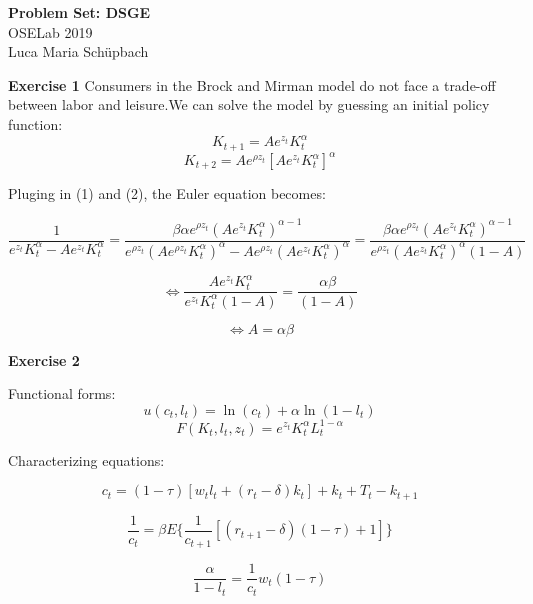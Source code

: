 \documentclass[letterpaper,12pt]{article}
\theoremstyle{definition}
\begin{document}
\begin{flushleft}
  \textbf{\large{Problem Set: DSGE}} \\
  OSELab 2019\\
  Luca Maria Schüpbach
\end{flushleft}

\vspace{5mm}

\noindent\textbf{Exercise 1}
Consumers in the Brock and Mirman model do not face a trade-off between labor and leisure.We can solve the model by guessing an initial policy function:
\begin{equation}
K_{t+1}=A e^{z_t}K_t^{\alpha}
\end{equation}
\begin{equation}
  K_{t+2}=Ae^{\rho z_t}[Ae^{z_t}K_t^{\alpha}]^{\alpha}
\end{equation}

Pluging in (1) and (2), the Euler equation becomes:

$$\frac{1}{e^{z_{t}} K_{t}^{\alpha}-Ae^{z_{t}} K_{t}^{\alpha}}=\frac{\beta \alpha e^{\rho z_{t}}(A e^{z_{t}} K_{t}^{\alpha})^{\alpha-1}}{e^{\rho z_t}(Ae^{\rho z_t}K_t^{\alpha})^{\alpha}-Ae^{\rho z_t}(Ae^{z_t}K_t^{\alpha})^{\alpha}}=\frac{\beta \alpha e^{\rho z_{t}}(A e^{z_{t}} K_{t}^{\alpha})^{\alpha-1}}{e^{\rho z_{t}}(A e^{z_{t}} K_{t}^{\alpha})^{\alpha}(1-A)} $$

$$\iff \frac{A e^{z_t} K_t^{\alpha}}{e^{z_t}K_t^{\alpha}(1-A)}=\frac{\alpha \beta}{(1-A)}$$

$$\iff A= \alpha \beta $$

\vspace{3mm}

\noindent\textbf{Exercise 2}

Functional forms:
$$u(c_{t}, l_{t})=\ln (c_{t})+\alpha \ln (1-l_{t})$$
$$F(K_{t}, l_{t}, z_{t})=e^{z_{t}} K_{t}^{\alpha} L_{t}^{1-\alpha}$$

Characterizing equations:

\begin{equation}
  \label{metric}
  c_{t}=(1-\tau)[w_{t} l_{t}+(r_{t}-\delta)k_{t}]+k_{t}+T_{t}-k_{t+1}
\end{equation}

\begin{equation}
  \label{metric}
  \frac{1}{c_t}=\beta E\{ \frac{1}{c_{t+1}}[(r_{t+1}-\delta)(1-\tau)+1]\}
\end{equation}

\begin{equation}
  \frac{\alpha}{1-l_t}=\frac{1}{c_t}w_t(1-\tau)
\end{equation}
\end{document}
